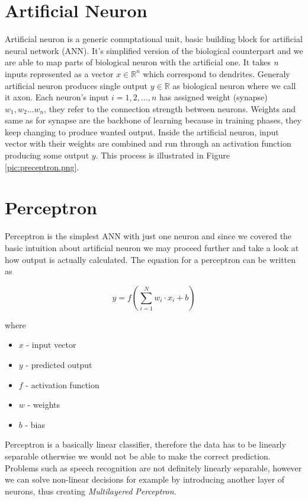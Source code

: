 \section{Artificial Neuron}

Artificial neuron is a generic comuptational unit, basic building block for artificial neural network (ANN).
It's simplified version of the biological counterpart and we are able to map parts of biological neuron with the artificial one.
It takes \textit{n} inputs represented as a vector $x\in\mathbb{R}^n$ which correspond to dendrites.
Generaly artificial neuron produces single output $y\in\mathbb{R}$ as biological neuron where we call it axon.
Each neuron's input $i=1,2,\ldots, n$ has assigned weight (synapse) $w_1, w_2 \ldots w_n$, they refer to the connection strength between neurons.
Weights and same as for synapse are the backbone of learning because in training phases, they keep changing to produce wanted output.
Inside the artificial neuron, input vector with their weights are combined and run through an activation function producing some output $y$.
This process is illustrated in Figure \ref{pic:preceptron.png}.


\section{Perceptron}

Perceptron is the simplest ANN with just one neuron and since we covered the basic intuition about artificial neuron we may proceed further and take a look at how output is actually calculated.
The equation for a perceptron can be written as

\begin{equation} \label{eq:1}
 y = f(\sum_{i=1}^N w_i \cdot x_i + b)
\end{equation}

where

\begin{itemize}
	\item $x$ - input vector
	\item $y$ - predicted output
  \item $f$ - activation function
	\item $w$ - weights
	\item $b$ - bias
\end{itemize}

Perceptron is a basically linear classifier, therefore the data has to be linearly separable otherwise we would not be able to make the correct prediction.
Problems such as speech recognition are not definitely linearly separable, however we can solve non-linear decisions for example by introducing another layer of neurons, thus creating \textit{Multilayered Perceptron}.


